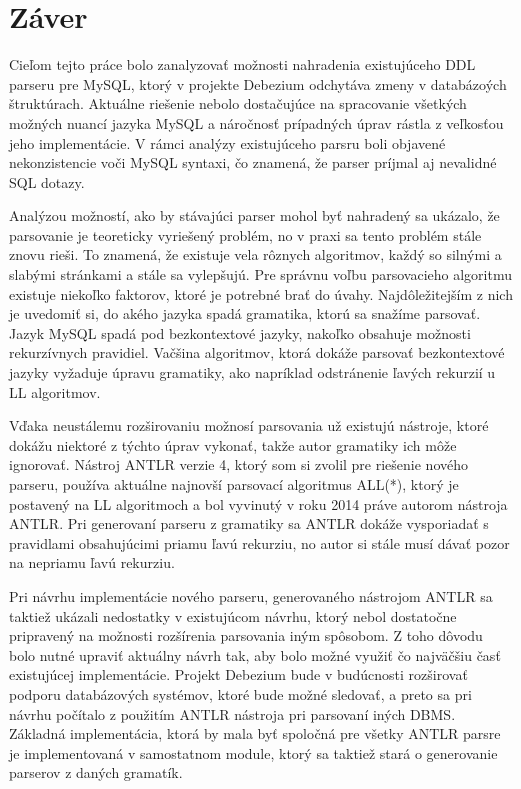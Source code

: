 \chapter{Záver}
Cieľom tejto práce bolo zanalyzovať možnosti nahradenia existujúceho DDL parseru pre MySQL, ktorý v projekte Debezium odchytáva zmeny v databázoých štruktúrach. Aktuálne riešenie nebolo dostačujúce na spracovanie všetkých možných nuancí jazyka MySQL a náročnosť prípadných úprav rástla z veľkosťou jeho implementácie. V rámci analýzy existujúceho parsru boli objavené nekonzistencie voči MySQL syntaxi, čo znamená, že parser príjmal aj nevalidné SQL dotazy.

Analýzou možností, ako by stávajúci parser mohol byť nahradený sa ukázalo, že parsovanie je teoreticky vyriešený problém, no v praxi sa tento problém stále znovu rieši. To znamená, že existuje vela rôznych algoritmov, každý so silnými a slabými stránkami a stále sa vylepšujú. Pre správnu voľbu parsovacieho algoritmu existuje niekoľko faktorov, ktoré je potrebné brať do úvahy. Najdôležitejším z nich je uvedomiť si, do akého jazyka spadá gramatika, ktorú sa snažíme parsovať. Jazyk MySQL spadá pod bezkontextové jazyky, nakoľko obsahuje možnosti rekurzívnych pravidiel. Vačšina algoritmov, ktorá dokáže parsovať bezkontextové jazyky vyžaduje úpravu gramatiky, ako napríklad odstránenie ľavých rekurzií u LL algoritmov. 

Vďaka neustálemu rozširovaniu možnosí parsovania už existujú nástroje, ktoré dokážu niektoré z týchto úprav vykonať, takže autor gramatiky ich môže ignorovať. Nástroj ANTLR verzie 4, ktorý som si zvolil pre riešenie nového parseru, používa aktuálne najnovší parsovací algoritmus ALL(*), ktorý je postavený na LL algoritmoch a bol vyvinutý v roku 2014 práve autorom nástroja ANTLR. Pri generovaní parseru z gramatiky sa ANTLR dokáže vysporiadať s pravidlami obsahujúcimi priamu ľavú rekurziu, no autor si stále musí dávať pozor na nepriamu ľavú rekurziu.

Pri návrhu implementácie nového parseru, generovaného nástrojom ANTLR sa taktiež ukázali nedostatky v existujúcom návrhu, ktorý nebol dostatočne pripravený na možnosti rozšírenia parsovania iným spôsobom. Z toho dôvodu bolo nutné upraviť aktuálny návrh tak, aby bolo možné využiť čo najväčšiu časť existujúcej implementácie. Projekt Debezium bude v budúcnosti rozširovať podporu databázových systémov, ktoré bude možné sledovať, a preto sa pri návrhu počítalo z použitím ANTLR nástroja pri parsovaní iných DBMS. Základná implementácia, ktorá by mala byť spoločná pre všetky ANTLR parsre je implementovaná v samostatnom module, ktorý sa taktiež stará o generovanie parserov z daných gramatík.

